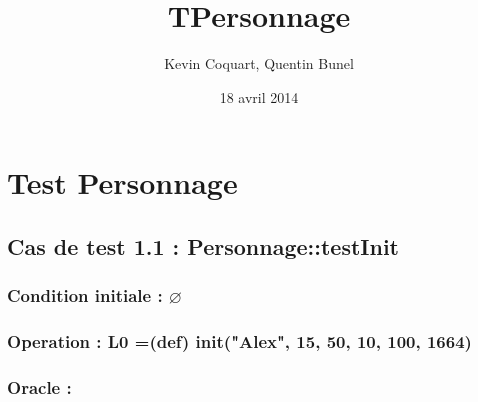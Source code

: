 \documentclass[11pt]{article}
\title{TPersonnage}
\author{Kevin Coquart, Quentin Bunel}
\date{18 avril 2014}
\begin{document}
\maketitle

\setcounter{tocdepth}{3}
\tableofcontents
\vspace*{1cm}
\section{Test Personnage}
\label{sec-1}


\subsection{Cas de test 1.1 : Personnage::testInit}
\label{sec-1.1}

\subsubsection{Condition initiale : $\varnothing$}
\label{sec-1.1.1}

\subsubsection{Operation : L0 =(def) init("Alex", 15, 50, 10, 100, 1664)}
\label{sec-1.1.2}

\subsubsection{Oracle :}
\label{sec-1.1.3}
\end{document}
